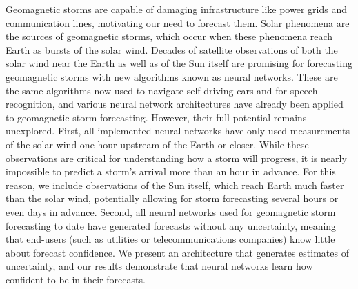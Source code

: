 Geomagnetic storms are capable of damaging infrastructure like power grids and communication lines, motivating our need to forecast them. Solar phenomena are the sources of geomagnetic storms, which occur when these phenomena reach Earth as bursts of the solar wind. Decades of satellite observations of both the solar wind near the Earth as well as of the Sun itself are promising for forecasting geomagnetic storms with new algorithms known as neural networks. These are the same algorithms now used to navigate self-driving cars and for speech recognition, and various neural network architectures have already been applied to geomagnetic storm forecasting. However, their full potential remains unexplored. First, all implemented neural networks have only used measurements of the solar wind one hour upstream of the Earth or closer. While these observations are critical for understanding how a storm will progress, it is nearly impossible to predict a storm's arrival more than an hour in advance. For this reason, we include observations of the Sun itself, which reach Earth much faster than the solar wind, potentially allowing for storm forecasting several hours or even days in advance. Second, all neural networks used for geomagnetic storm forecasting to date have generated forecasts without any uncertainty, meaning that end-users (such as utilities or telecommunications companies) know little about forecast confidence. We present an architecture that generates estimates of uncertainty, and our results demonstrate that neural networks learn how confident to be in their forecasts.